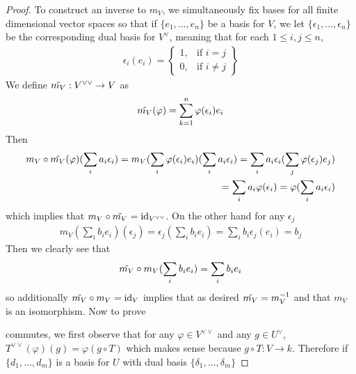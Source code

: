 \documentclass{article}
\newcommand{\id}{\mathrm{id}}
\begin{document}
\begin{proof}
    
    To construct an inverse to $m_V$, we simultaneously fix bases for all finite dimensional vector spaces so that if $\{e_1,\dots, e_n\}$ be a basis for $V$, we let $\{\epsilon_1, \dots, \epsilon_n\}$ be the corresponding dual basis for $V^{\lor}$, meaning that for each $1\le i,j\le n$,
    \begin{align*}
        \epsilon_i(e_i)=\left\{
    \begin{array}{lr}
        1, & \text{if } i =j\\
        0, & \text{if } i\ne j
    \end{array}
\right\}
    \end{align*}
    We define $\Tilde{m_V}:V^{\lor \lor}\to V$ as
    \begin{align*}
        \Tilde{m_V}(\varphi)=\sum_{k=1}^n\varphi(\epsilon_i) e_i
    \end{align*}
    Then
    \begin{align*}
        m_V\circ \Tilde{m_V}(\varphi)(\sum_i a_i \epsilon_i)=m_V(\sum_i \varphi(\epsilon_i)e_i)(\sum_i a_i \epsilon_i)=\sum_i a_i \epsilon_i(\sum_j \varphi(\epsilon_j)e_j)\\
        =\sum_i a_i \varphi(\epsilon_i)=\varphi(\sum_i a_i \epsilon_i)
    \end{align*}
    which implies that $m_V\circ \Tilde{m_V}=\id_{V^{\lor \lor}}$. On the other hand for any $\epsilon_j$
    \begin{align*}
        m_V(\sum_i b_ie_i)(\epsilon_j)=\epsilon_j(\sum_i b_ie_i)=\sum_i b_i \epsilon_j(e_i)=b_j
    \end{align*}
    Then we clearly see that 
    \begin{align*}
        \Tilde{m_V}\circ m_V(\sum_i b_ie_i)=\sum_i b_i e_i
    \end{align*}
    so additionally $\Tilde{m_V}\circ m_V=\id_V$ implies that as desired $\Tilde{m_V}=m_V^{-1}$ and that $m_V$ is an isomorphism. Now to prove
    \begin{center}
    \end{center}
    commutes, we first observe that for any $\varphi\in V^{\lor \lor}$ and any $g\in U^\lor$, $T^{\lor \lor}(\varphi)(g)=\varphi(g\circ T)$ which makes sense because $g\circ T:V\to k$. Therefore if $\{d_1,\dots, d_m\}$ is a basis for $U$ with dual basis $\{\delta_1,\dots, \delta_m\}$

\end{proof}
\end{document}
